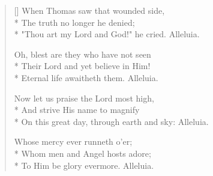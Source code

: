\begin{verse}[\versewidth]
When Thomas saw that wounded side,\\*
The truth no longer he denied;                   \\* 
"Thou art my Lord and God!" he cried.             
      Alleluia.

Oh, blest are they who have not seen \\*             
Their Lord and yet believe in Him!                \\*
Eternal life awaitheth them.                      
       Alleluia.

Now let us praise the Lord most high,             \\*
And strive His name to magnify                    \\*
On this great day, through earth and sky:         
          Alleluia.

Whose mercy ever runneth o'er;\\*
Whom men and Angel hosts adore;               \\*    
To Him be glory evermore.                         
       Alleluia.

\end{verse}



